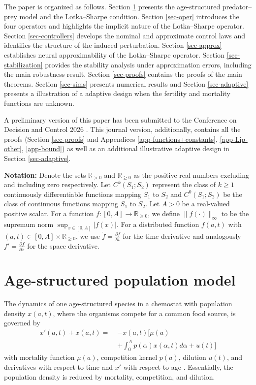 \documentclass[journal,twoside,web]{ieeecolor}
\begin{document}
The paper is organized as follows.  Section \ref{sec-pop} presents the age-structured predator–prey model and the Lotka–Sharpe condition. Section \ref{sec-oper} introduces the four operators and highlights the implicit nature of the Lotka–Sharpe operator. Section \ref{sec-controllers} develops the nominal and approximate control laws and identifies the structure of the induced perturbation. Section \ref{sec-approx} establishes neural approximability of the Lotka–Sharpe operator. Section \ref{sec-stabilization} provides the stability analysis under approximation errors, including the main robustness result. Section \ref{sec-proofs} contains the proofs of the main theorems. Section \ref{sec-sims} presents numerical results and Section \ref{sec-adaptive} presents a illustration of a adaptive design when the fertility and mortality functions are unknown. 

\color{blue}
A preliminary version of this paper has been submitted to the Conference on Decision and Control 2026 \cite{cdc2026version}. This journal version, additionally, contains all the proofs (Section \ref{sec-proofs} and Appendices \ref{app-functions+constants}, \ref{app-Lip-other}, \ref{app-bound}) as well as an additional illustrative adaptive design in Section \ref{sec-adaptive}.
\color{black}

\textbf{Notation:}
Denote the sets $\mathbb{R}_{>0}$ and $\mathbb{R}_{\geq 0}$ as the positive real numbers excluding and including zero respectively. Let $C^k(S_1;S_2)$ represent the class of $k \geq 1$ continuously differentiable functions mapping $S_1$ to $S_2$ and $C^0(S_1; S_2)$ be the class of continuous functions mapping $S_1$ to $S_2$. Let $A> 0$ be a real-valued positive scalar. For a function $f: [0, A] \to \mathbb{R}_{\geq 0}$, we define $\|f(\cdot)\|_\infty$ to be the supremum norm $\sup_{x \in [0, A]}|f(x)|$. For a distributed function $f(a, t)$ with $(a, t) \in [0, A] \times \mathbb{R}_{\geq 0}$, we use $\dot{f} = \frac{\partial f}{\partial t}$ for the time derivative and analogously $f' = \frac{\partial f}{\partial x}$ for the space derivative.  

\section{Age-structured population model}
\label{sec-pop}

The dynamics of one age-structured species in a chemostat with population density $x(a,t)$, where the organisms compete for a common food source, is governed by
\begin{align}
    x'(a,t) + \dot x(a,t) =\;& - x(a,t) \Big[ \mu(a)\nonumber \\ & + \int_0^A p(\alpha)x(\alpha,t) d\alpha 
    +u(t) \Big] \label{eq:one-pop-pde}
\end{align}
with mortality function $\mu(a)$, competition kernel $p(a)$, dilution $u(t)$, and derivatives with respect to time and $x'$ with respect to age \cite{mckendrick1925Applications}.
Essentially, the population density is reduced by mortality, competition, and dilution.
\end{document}
